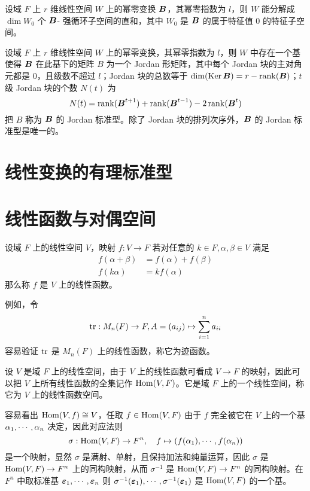 \begin{theorem}
	设域 $F$ 上 $r$ 维线性空间 $W$ 上的幂零变换 $\boldsymbol{B}$，其幂零指数为 $l$，则 $W$ 能分解成 $\dim W_0$ 个 $\boldsymbol{B}$- 强循环子空间的直和，其中 $W_0$ 是 $\boldsymbol{B}$ 的属于特征值 $0$ 的特征子空间。
\end{theorem}

\begin{theorem}
	设域 $F$ 上 $r$ 维线性空间 $W$ 上的幂零变换，其幂零指数为 $l$，则 $W$ 中存在一个基使得 $\boldsymbol{B}$ 在此基下的矩阵 $B$ 为一个 Jordan 形矩阵，其中每个 Jordan 块的主对角元都是 $0$，且级数不超过 $l$；Jordan 块的总数等于 $\dim(\operatorname{Ker} \boldsymbol{B}) = r - \operatorname{rank}(\boldsymbol{B})$；$t$ 级 Jordan 块的个数 $N(t)$ 为
	\[ N(t) = \operatorname{rank}(\boldsymbol{B}^{t+1}) + \operatorname{rank}(\boldsymbol{B}^{t-1}) - 2 \operatorname{rank}(\boldsymbol{B}^t) \]
	把 $B$ 称为 $\boldsymbol{B}$ 的 Jordan 标准型。除了 Jordan 块的排列次序外，$\boldsymbol{B}$ 的 Jordan 标准型是唯一的。
\end{theorem}

\section{线性变换的有理标准型}

\section{线性函数与对偶空间}

\begin{definition}[线性函数]
	设域 $F$ 上的线性空间 $V$，映射 $f : V \to F$ 若对任意的 $k \in F, \alpha,\beta \in V$ 满足
	\[
		\begin{aligned}
			f(\alpha+\beta) & = f(\alpha) + f(\beta) \\
			f(k\alpha)	  & = kf(\alpha)
		\end{aligned}
	\]
	那么称 $f$ 是 $V$ 上的线性函数。
\end{definition}

例如，令
\[ \operatorname{tr} : M_n(F) \to F, A = (a_{ij}) \mapsto \sum_{i=1}^{n} a_{ii} \]
容易验证 $\operatorname{tr}$ 是 $M_n(F)$ 上的线性函数，称它为迹函数。

设 $V$ 是域 $F$ 上的线性空间，由于 $V$ 上的线性函数可看成 $V \to F$ 的映射，因此可以把 $V$ 上所有线性函数的全集记作 $\operatorname{Hom}(V,F)$。它是域 $F$ 上的一个线性空间，称它为 $V$ 上的线性函数空间。

容易看出 $\operatorname{Hom}(V,f) \cong V$，任取 $f \in \operatorname{Hom}(V,F)$ 由于 $f$ 完全被它在 $V$ 上的一个基 $\alpha_1,\cdots,\alpha_n$ 决定，因此对应法则
\[ \sigma : \operatorname{Hom}(V,F) \to F^n, \quad f \mapsto (f(\alpha_1),\cdots,f(\alpha_n)) \]
是一个映射，显然 $\sigma$ 是满射、单射，且保持加法和纯量运算，因此 $\sigma$ 是 $\operatorname{Hom}(V,F) \to F^n$ 上的同构映射，从而 $\sigma^{-1}$ 是 $\operatorname{Hom}(V,F) \to F^n$ 的同构映射。在 $F^n$ 中取标准基 $\boldsymbol{\varepsilon}_1,\cdots,\boldsymbol{\varepsilon}_n$ 则 $\sigma^{-1}(\boldsymbol{\varepsilon}_1),\cdots,\sigma^{-1}(\boldsymbol{\varepsilon}_1)$ 是 $\operatorname{Hom}(V,F)$ 的一个基。

